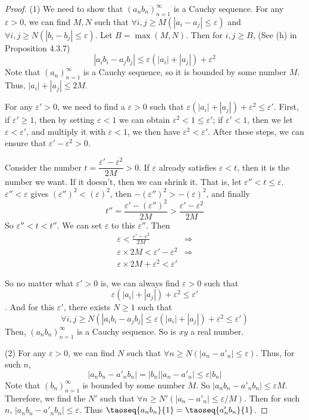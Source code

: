 \begin{proof}
(1)
We need to show that $(a_nb_n)^\infty_{n=1}$ is a Cauchy sequence. For any $\varepsilon>0$, we can find $M,N$ such that 
$\forall i,j\geq M(|a_i-a_j| \leq \varepsilon)$ and $\forall i,j\geq N(|b_i-b_j| \leq \varepsilon)$. Let $B = \max{(M,N)}$. Then for 
$i,j \geq B$, (See (h) in Proposition 4.3.7)
\[
|a_ib_i - a_jb_j| \leq \varepsilon(|a_i| + |a_j|) + \varepsilon^2
\]
Note that $(a_n)^\infty_{n=1}$ is a Cauchy sequence, so it is bounded by some number $M$. Thus, 
$|a_i| + |a_j| \leq 2M$. 

For any $\varepsilon' >0$, we need to find a $\varepsilon >0$ such that 
$\varepsilon(|a_i| + |a_j|) + \varepsilon^2 \leq \varepsilon'$. First, if $\varepsilon' \geq 1$, then by 
setting $\varepsilon < 1$ we can obtain $\varepsilon^2 < 1 \leq \varepsilon'$; if $\varepsilon' < 1$, then we let $\varepsilon < \varepsilon'$, and multiply it with $\varepsilon < 1$, we then have 
$\varepsilon^2 < \varepsilon'$. After these steps, we can ensure that $\varepsilon' - \varepsilon^2>0$. 

Consider the number $t = \dfrac{\varepsilon' - \varepsilon^2}{2M}>0$. If $\varepsilon$ already satisfies 
$\varepsilon <t$, then it is the number we want. If it doesn't, then we can shrink it. That is, let
$\varepsilon'' < t \leq \varepsilon$. $\varepsilon'' < \varepsilon$ gives 
$(\varepsilon'')^2 < (\varepsilon)^2$, then $-(\varepsilon'')^2 > -(\varepsilon)^2$, and finally 
\[
t'' = \frac{\varepsilon' - (\varepsilon'')^2}{2M}>\frac{\varepsilon' - \varepsilon^2}{2M}
\]
So $\varepsilon'' < t < t''$. We can set $\varepsilon$ to this $\varepsilon''$. Then 
\begin{align*}
\varepsilon < \frac{\varepsilon' - \varepsilon^2}{2M} &\Longrightarrow \\
\varepsilon \times 2M < \varepsilon' - \varepsilon^2 &\Longrightarrow \\
\varepsilon \times 2M + \varepsilon^2 < \varepsilon'
\end{align*}

So no matter what $\varepsilon'>0$ is, we can always find $\varepsilon >0$ such that 
\[
\varepsilon(|a_i| + |a_j|) + \varepsilon^2 \leq \varepsilon'
\].
And for this $\varepsilon'$, there exists $N\geq 1$ such that 
\[
\forall i,j\geq N(|a_ib_i - a_jb_j| \leq \varepsilon(|a_i| + |a_j|) + \varepsilon^2 \leq \varepsilon')
\]
Then, $(a_nb_n)^\infty_{n=1}$ is a Cauchy sequence. So is $xy$ a real number.

(2)
For any $\varepsilon >0$, we can find $N$ such that $\forall n\geq N(|a_n-a'_n|\leq \varepsilon)$. Thus, for 
such $n$, 
\[
|a_nb_n - a'_nb_n| = |b_n||a_n - a'_n| \leq \varepsilon|b_n|
\]
Note that $(b_n)^\infty_{n=1}$ is bounded by some number $M$. So $|a_nb_n - a'_nb_n| \leq \varepsilon M$. 
Therefore, we find the $N'$ such that $\forall n\geq N'(|a_n-a'_n|\leq \varepsilon/M)$. Then for such $n$, 
$|a_nb_n - a'_nb_n| \leq \varepsilon$. Thus $\taoseq{a_nb_n}{1} = \taoseq{a'_nb_n}{1}$.
\end{proof}

